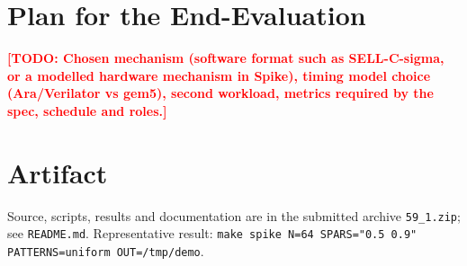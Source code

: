 \documentclass[11pt,a4paper]{article}
\newcommand{\todo}[1]{\textcolor{red}{\textbf{[TODO: #1]}}}
\begin{document}
\section{Plan for the End-Evaluation}
\todo{Chosen mechanism (software format such as SELL-C-sigma, or a modelled hardware mechanism in Spike), timing model choice (Ara/Verilator vs gem5), second workload, metrics required by the spec, schedule and roles.}

\section*{Artifact}
Source, scripts, results and documentation are in the submitted archive \texttt{59\_1.zip}; see \texttt{README.md}. Representative result: \texttt{make spike N=64 SPARS="0.5 0.9" PATTERNS=uniform OUT=/tmp/demo}.



\end{document}
